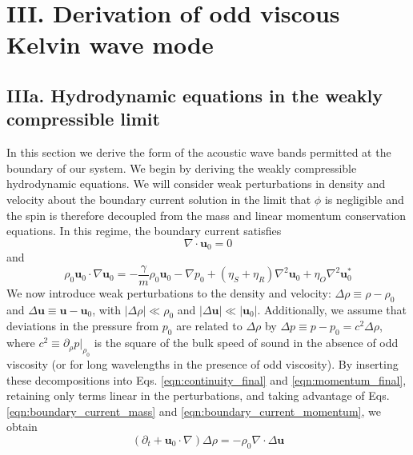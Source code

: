 \documentclass[%
 reprint,
superscriptaddress,
longbibliography,
 amsmath,amssymb,
 prl,
 citeautoscript,
]{revtex4-1}
\begin{document}
\section{III. Derivation of odd viscous Kelvin wave mode}
\label{sec:Kelvin}

\subsection{IIIa. Hydrodynamic equations in the weakly compressible limit}

In this section we derive the form of the acoustic wave bands permitted at the boundary of our system. We begin by deriving the weakly compressible hydrodynamic equations. We will consider weak perturbations in density and velocity about the boundary current solution in the limit that $\phi$ is negligible and the spin is therefore decoupled from the mass and linear momentum conservation equations. In this regime, the boundary current satisfies
\begin{equation}
\nabla \cdot {\boldsymbol u}_0 = 0
\label{eqn:boundary_current_mass}
\end{equation}
and
\begin{equation}
\rho_0 {\boldsymbol u}_0 \cdot \nabla {\boldsymbol u}_0 = - \frac{\gamma}{m} \rho_0 {\boldsymbol u}_0 - \nabla p_0 + \left( \eta_S + \eta_R \right) \nabla^2 {\boldsymbol u}_0 + \eta_O \nabla^2 {\boldsymbol u}_0^*
\label{eqn:boundary_current_momentum}
\end{equation}
We now introduce weak perturbations to the density and velocity: $\Delta \rho \equiv \rho - \rho_0$ and $\Delta {\boldsymbol u} \equiv {\boldsymbol u} - {\boldsymbol u}_0$, with $\left| \Delta \rho \right| \ll \rho_0$ and $\left| \Delta {\boldsymbol u} \right| \ll \left| {\boldsymbol u}_0 \right|$. Additionally, we assume that deviations in the pressure from $p_0$ are related to $\Delta \rho$ by $\Delta p \equiv p - p_0 = c^2 \Delta \rho$, where $c^2 \equiv \partial_\rho p |_{\rho_0}$ is the square of the bulk speed of sound in the absence of odd viscosity (or for long wavelengths in the presence of odd viscosity). By inserting these decompositions into Eqs. \ref{eqn:continuity_final} and \ref{eqn:momentum_final}, retaining only terms linear in the perturbations, and taking advantage of Eqs. \ref{eqn:boundary_current_mass} and \ref{eqn:boundary_current_momentum}, we obtain
\begin{equation}
\left( \partial_t + {\boldsymbol u}_0 \cdot \nabla \right) \Delta \rho = - \rho_0 \nabla \cdot \Delta {\boldsymbol u}
\label{eqn:wave_continuity}
\end{equation}
\end{document}
